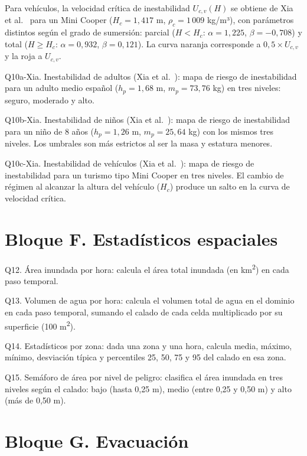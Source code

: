 Para vehículos, la velocidad crítica de inestabilidad $U_{c,v}(H)$ se obtiene de Xia et al.\ \cite{xia2011vehicles} para un Mini Cooper ($H_c = 1{,}417$ m, $\rho_c = 1\,009$ kg/m³), con parámetros distintos según el grado de sumersión: parcial ($H < H_c$: $\alpha = 1{,}225$, $\beta = -0{,}708$) y total ($H \geq H_c$: $\alpha = 0{,}932$, $\beta = 0{,}121$). La curva naranja corresponde a $0{,}5 \times U_{c,v}$ y la roja a $U_{c,v}$.

Q10a-Xia. Inestabilidad de adultos (Xia et al.\ \cite{xia2014}): mapa de riesgo de inestabilidad para un adulto medio español ($h_p = 1{,}68$ m, $m_p = 73{,}76$ kg) en tres niveles: seguro, moderado y alto.

Q10b-Xia. Inestabilidad de niños (Xia et al.\ \cite{xia2014}): mapa de riesgo de inestabilidad para un niño de 8 años ($h_p = 1{,}26$ m, $m_p = 25{,}64$ kg) con los mismos tres niveles. Los umbrales son más estrictos al ser la masa y estatura menores.

Q10c-Xia. Inestabilidad de vehículos (Xia et al.\ \cite{xia2011vehicles}): mapa de riesgo de inestabilidad para un turismo tipo Mini Cooper en tres niveles. El cambio de régimen al alcanzar la altura del vehículo ($H_c$) produce un salto en la curva de velocidad crítica.

\section{Bloque F. Estadísticos espaciales}\label{bloque-f.-estadisticos-espaciales}

Q12. Área inundada por hora: calcula el área total inundada (en km\textsuperscript{2}) en cada paso temporal.

Q13. Volumen de agua por hora: calcula el volumen total de agua en el dominio en cada paso temporal, sumando el calado de cada celda multiplicado por su superficie (100 m\textsuperscript{2}).

Q14. Estadísticos por zona: dada una zona y una hora, calcula media, máximo, mínimo, desviación típica y percentiles 25, 50, 75 y 95 del calado en esa zona.

Q15. Semáforo de área por nivel de peligro: clasifica el área inundada en tres niveles según el calado: bajo (hasta 0,25 m), medio (entre 0,25 y 0,50 m) y alto (más de 0,50 m).

\section{Bloque G. Evacuación}\label{bloque-g.-evacuacion}

